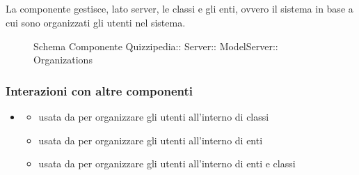 \subsection{}
La componente gestisce, lato server, le classi e gli enti, ovvero il sistema in base a cui sono organizzati gli utenti nel sistema.
\begin{figure}[H]
\centering
\noindent{}
\caption[Schema Componente Organizations]{Schema Componente Quizzipedia:: Server:: ModelServer:: Organizations}
\end{figure}
\subsubsection{Interazioni con altre componenti}
\begin{itemize}
\item {}
\begin{itemize}
\item usata da  per organizzare gli utenti all'interno di classi
\item usata da  per organizzare gli utenti all'interno di enti
\item usata da  per organizzare gli utenti all'interno di enti e classi
\end{itemize}
\end{itemize}
